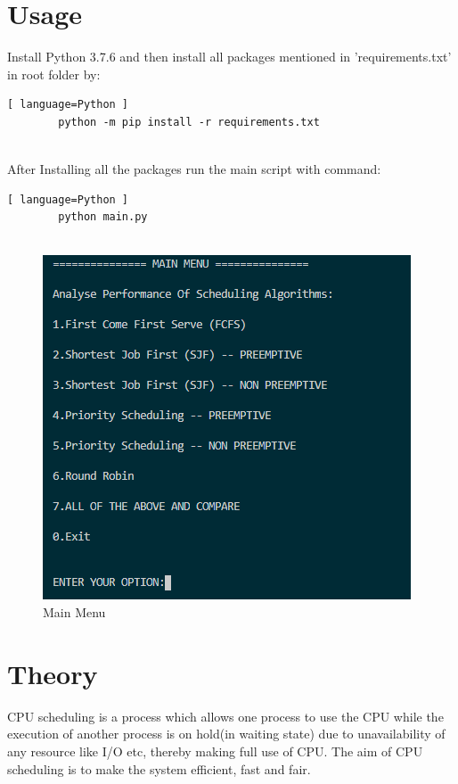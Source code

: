 \documentclass[11pt,a4paper]{report}
\begin{document}
\chapter{Usage}

Install Python 3.7.6 and then install all packages mentioned in 'requirements.txt' in root folder by:

	\begin{lstlisting}[ language=Python ]
		python -m pip install -r requirements.txt
		
	\end{lstlisting}

After Installing all the packages run the main script with command:

\begin{center}
	\begin{lstlisting}[ language=Python ]
		python main.py
		
	\end{lstlisting}
\end{center}


\begin{figure}[H]
\begin{center}
\includegraphics{./img/main.PNG}
\caption{Main Menu}
\label{fig}
\end{center}
\end{figure}


\chapter{Theory}

\hspace*{\parindent}CPU scheduling is a process which allows one process to use the CPU while the execution of another process is on hold(in waiting state) due to unavailability of any resource like I/O etc, thereby making full use of CPU. The aim of CPU scheduling is to make the system efficient, fast and fair.
\end{document}
